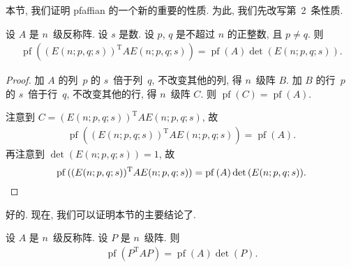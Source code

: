 \TheoremPfaffianMulitply*

\TheoremPfaffianMulitplyAndAdd*

\TheoremPfaffianSquareDet*

本节, 我们证明 pfaffian 的一个新的重要的性质.
为此, 我们先改写第~2~条性质.

\begin{theorem}
    设 \(A\) 是 \(n\)~级反称阵.
    设 \(s\) 是数.
    设 \(p\), \(q\) 是不超过 \(n\) 的正整数,
    且 \(p \neq q\).
    则
    \begin{align*}
        \operatorname{pf}{( (E(n; p, q; s))^{\mathrm{T}}
            A E(n; p, q; s) )}
        = \operatorname{pf} {(A)} \det {(E(n; p, q; s))}.
    \end{align*}
\end{theorem}

\begin{proof}
    加 \(A\) 的列~\(p\) 的 \(s\)~倍于列~\(q\),
    不改变其他的列, 得 \(n\)~级阵 \(B\).
    加 \(B\) 的行~\(p\) 的 \(s\)~倍于行~\(q\),
    不改变其他的行, 得 \(n\)~级阵 \(C\).
    则 \(\operatorname{pf} {(C)} = \operatorname{pf} {(A)}\).

    注意到 \(C = (E(n; p, q; s))^{\mathrm{T}}
    A E(n; p, q; s)\),
    故
    \begin{align*}
        \operatorname{pf}{( (E(n; p, q; s))^{\mathrm{T}}
            A E(n; p, q; s) )} = \operatorname{pf} {(A)}.
    \end{align*}
    再注意到 \(\det {(E(n; p, q; s))} = 1\),
    故
    \begin{equation*}
        \operatorname{pf}{( (E(n; p, q; s))^{\mathrm{T}}
            A E(n; p, q; s) )}
        =
        \operatorname{pf} {(A)}
        \det {(E(n; p, q; s))}.
        \qedhere
    \end{equation*}
\end{proof}

好的.
现在, 我们可以证明本节的主要结论了.

\begin{theorem}
    设 \(A\) 是 \(n\)~级反称阵.
    设 \(P\) 是 \(n\)~级阵.
    则
    \begin{align*}
        \operatorname{pf} {(P^{\mathrm{T}} A P)}
        = \operatorname{pf} {(A)} \det {(P)}.
    \end{align*}
\end{theorem}

